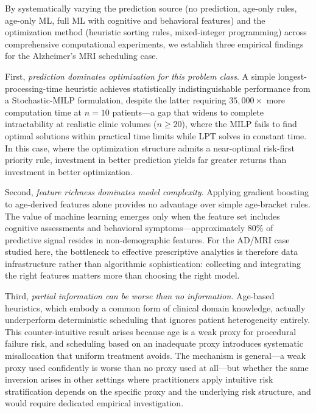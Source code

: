 \documentclass[11pt,a4paper]{article}
\begin{document}
By systematically varying the prediction source (no prediction, age-only rules, age-only ML, full ML with cognitive and behavioral features) and the optimization method (heuristic sorting rules, mixed-integer programming) across comprehensive computational experiments, we establish three empirical findings for the Alzheimer's MRI scheduling case.

First, \textit{prediction dominates optimization for this problem class}. A simple longest-processing-time heuristic achieves statistically indistinguishable performance from a Stochastic-MILP formulation, despite the latter requiring $35{,}000\times$ more computation time at $n = 10$ patients---a gap that widens to complete intractability at realistic clinic volumes ($n \geq 20$), where the MILP fails to find optimal solutions within practical time limits while LPT solves in constant time. In this case, where the optimization structure admits a near-optimal risk-first priority rule, investment in better prediction yields far greater returns than investment in better optimization.

Second, \textit{feature richness dominates model complexity}. Applying gradient boosting to age-derived features alone provides no advantage over simple age-bracket rules. The value of machine learning emerges only when the feature set includes cognitive assessments and behavioral symptoms---approximately 80\% of predictive signal resides in non-demographic features. For the AD/MRI case studied here, the bottleneck to effective prescriptive analytics is therefore data infrastructure rather than algorithmic sophistication: collecting and integrating the right features matters more than choosing the right model.

Third, \textit{partial information can be worse than no information}. Age-based heuristics, which embody a common form of clinical domain knowledge, actually underperform deterministic scheduling that ignores patient heterogeneity entirely. This counter-intuitive result arises because age is a weak proxy for procedural failure risk, and scheduling based on an inadequate proxy introduces systematic misallocation that uniform treatment avoids. The mechanism is general---a weak proxy used confidently is worse than no proxy used at all---but whether the same inversion arises in other settings where practitioners apply intuitive risk stratification depends on the specific proxy and the underlying risk structure, and would require dedicated empirical investigation.
\end{document}
